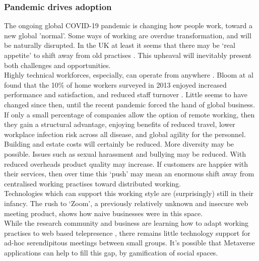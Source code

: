 \subsubsection{Pandemic drives adoption}
The ongoing global COVID-19 pandemic is changing how people work, toward a new global 'normal'. Some ways of working are overdue transformation, and will be naturally disrupted. In the UK at least it seems that there may be `real appetite' to shift away from old practises \cite{skychange}. This upheaval will inevitably present both challenges and opportunities.\\
Highly technical workforces, especially, can operate from anywhere \cite{globalworkplace}. Bloom at al found that the 10\% of home workers surveyed in 2013 enjoyed increased performance and satisfaction, and reduced staff turnover \cite{Bloom2015-rg}. Little seems to have changed since then, until the recent pandemic forced the hand of global business. If only a small percentage of companies allow the option of remote working, then they gain a structural advantage, enjoying benefits of reduced travel, lower workplace infection risk across all disease, and global agility for the personnel. Building and estate costs will certainly be reduced. More diversity may be possible. Issues such as sexual harassment and bullying may be reduced.  With reduced overheads product quality may increase. If customers are happier with their services, then over time this `push' may mean an enormous shift away from centralised working practises toward distributed working. \\
Technologies which can support this working style are (surprisingly) still in their infancy. The rush to `Zoom', a previously relatively unknown and insecure \cite{aiken2020zooming} web meeting product, shows how naive businesses were in this space. \\
While the research community and business are learning how to adapt working practises to web based telepresence \cite{oeppen2020human}, there remains little technology support for ad-hoc serendipitous meetings between small groups. It's possible that Metaverse applications can help to fill this gap, by gamification of social spaces.\\

